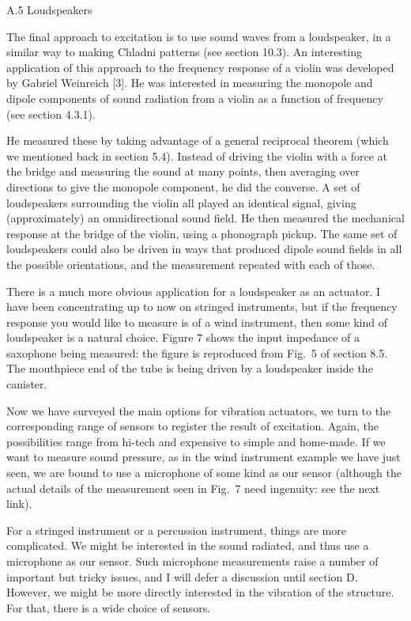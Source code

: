   A.5 Loudspeakers 

  The final approach to excitation is to use sound waves from a loudspeaker, in 
  a similar way to making Chladni patterns (see section 10.3). An interesting 
  application of this approach to the frequency response of a violin was 
  developed by Gabriel Weinreich [3]. He was interested in measuring the 
  monopole and dipole components of sound radiation from a violin as a function 
  of frequency (see section 4.3.1). 

  He measured these by taking advantage of a general reciprocal theorem (which 
  we mentioned back in section 5.4). Instead of driving the violin with a force 
  at the bridge and measuring the sound at many points, then averaging over 
  directions to give the monopole component, he did the converse. A set of 
  loudspeakers surrounding the violin all played an identical signal, giving 
  (approximately) an omnidirectional sound field. He then measured the 
  mechanical response at the bridge of the violin, using a phonograph pickup. 
  The same set of loudspeakers could also be driven in ways that produced 
  dipole sound fields in all the possible orientations, and the measurement 
  repeated with each of those. 

  There is a much more obvious application for a loudspeaker as an actuator. I 
  have been concentrating up to now on stringed instruments, but if the 
  frequency response you would like to measure is of a wind instrument, then 
  some kind of loudspeaker is a natural choice. Figure 7 shows the input 
  impedance of a saxophone being measured: the figure is reproduced from Fig.\ 
  5 of section 8.5. The mouthpiece end of the tube is being driven by a 
  loudspeaker inside the canister. 


  Now we have surveyed the main options for vibration actuators, we turn to the 
  corresponding range of sensors to register the result of excitation. Again, 
  the possibilities range from hi-tech and expensive to simple and home-made. 
  If we want to measure sound pressure, as in the wind instrument example we 
  have just seen, we are bound to use a microphone of some kind as our sensor 
  (although the actual details of the measurement seen in Fig.\ 7 need 
  ingenuity: see the next link). 

  For a stringed instrument or a percussion instrument, things are more 
  complicated. We might be interested in the sound radiated, and thus use a 
  microphone as our sensor. Such microphone measurements raise a number of 
  important but tricky issues, and I will defer a discussion until section D. 
  However, we might be more directly interested in the vibration of the 
  structure. For that, there is a wide choice of sensors. 

